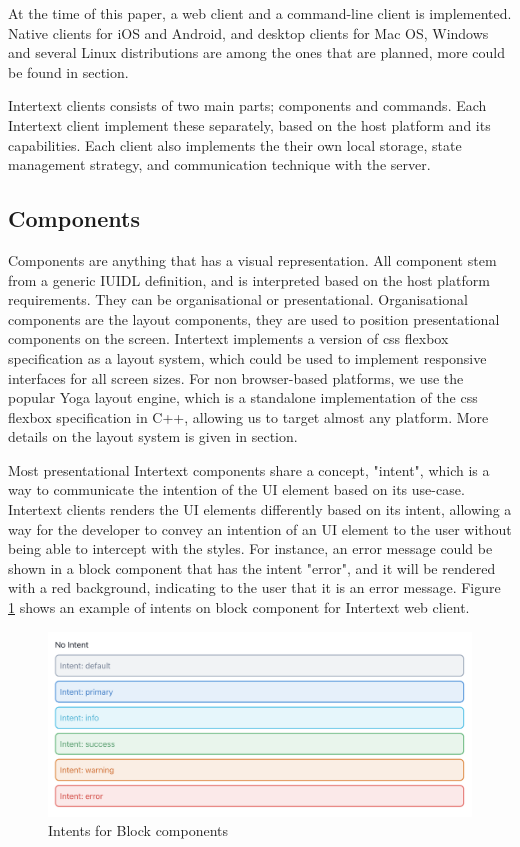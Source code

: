 At the time of this paper, a web client and a command-line client is implemented. Native clients for iOS and Android, and desktop clients for Mac OS, Windows and several Linux distributions are among the ones that are planned, more could be found in  section.

Intertext clients consists of two main parts; components and commands. Each Intertext client implement these separately, based on the host platform and its capabilities. Each client also implements the  their own local storage, state management strategy, and communication technique with the server.

\subsection{Components}

Components are anything that has a visual representation. All component stem from a generic IUIDL definition, and is interpreted based on the host platform requirements. They can be organisational or presentational. Organisational components are the layout components, they are used to position presentational components on the screen. Intertext implements a version of css flexbox specification as a layout system, which could be used to implement responsive interfaces for all screen sizes. For non browser-based platforms, we use the popular Yoga layout engine, which is a standalone implementation of the css flexbox specification in C++, allowing us to target almost any platform. More details on the layout system is given in  section.

Most presentational Intertext components share a concept, "intent", which is a way to communicate the intention of the UI element based on its use-case. Intertext clients renders the UI elements differently based on its intent, allowing a way for the developer to convey an intention of an UI element to the user without being able to intercept with the styles. For instance, an error message could be shown in a block component that has the intent "error", and it will be rendered with a red background, indicating to the user that it is an error message. Figure \ref{fig:intents} shows an example of intents on block component for Intertext web client.

\begin{figure}
  \centering
  \includegraphics[width=13cm]{thesis/paper/images/intents.png}
  \caption{Intents for Block components}%
  \label{fig:intents}%
\end{figure}

